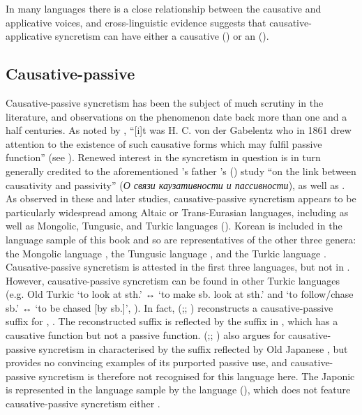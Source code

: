 In many languages there is a close relationship between the causative and applicative voices, and cross-linguistic evidence suggests that causative-applicative syncretism can have either a causative () or an  ().

\subsection{Causative-passive} \label{sec:simple-syncretism:caus-pass}
Causative-passive syncretism has been the subject of much scrutiny in the literature, and observations on the phenomenon date back more than one and a half centuries. As noted by \citet[4f.]{nedyalkov:1991}, “[i]t was H. C. von der Gabelentz who in 1861 drew attention to the existence of such causative forms which may fulfil passive function” (see \citealt[516--529]{von-der-gabelentz:1861}). Renewed interest in the syncretism in question is in turn generally credited to the aforementioned \citeauthor{nedyalkov:1991}’s father \citeauthor{nedjalkov:1964}’s (\citeyear{nedjalkov:1964}) study “on the link between causativity and passivity” (\textit{О связи каузативности и пассивности}), as well as \citet[38ff.]{nedjalkov:silnickij:1969}. As observed in these and later studies, causative-passive syncretism appears to be particularly widespread among Altaic or Trans-Eurasian languages, including  as well as Mongolic, Tungusic, and Turkic languages (\citealt{robbeets:2007}). Korean is included in the language sample of this book and so are representatives of the other three genera: the Mongolic language , the Tungusic language , and the Turkic language . Causative-passive syncretism is attested in the first three languages, but not in  \citep{zinnatullina:1993, burbiel:2018}. However, causative-passive syncretism can be found in other Turkic languages (e.g. Old Turkic  ‘to look at sth.’ ↔  ‘to make sb. look at sth.’ and  ‘to follow/chase sb.’ ↔  ‘to be chased [by sb.]’, \citealt[291f.]{robbeets:2015}). In fact, \citeauthor{robbeets:2007} (\citeyear[178ff.]{robbeets:2007};; \citeyear[290ff.]{robbeets:2015}) reconstructs a causative-passive suffix for , . The reconstructed suffix is reflected by the suffix  in , which has a causative function but not a passive function. \citeauthor{robbeets:2007} (\citeyear[165f.]{robbeets:2007};; \citeyear[276f.]{robbeets:2015}) also argues for causative-passive syncretism in  characterised by the suffix  reflected by Old Japanese , but provides no convincing examples of its purported passive use, and causative-passive syncretism is therefore not recognised for this language here. The Japonic  is represented in the language sample by the language  (), which does not feature causative-passive syncretism either \citep{shimoji:2008}.
